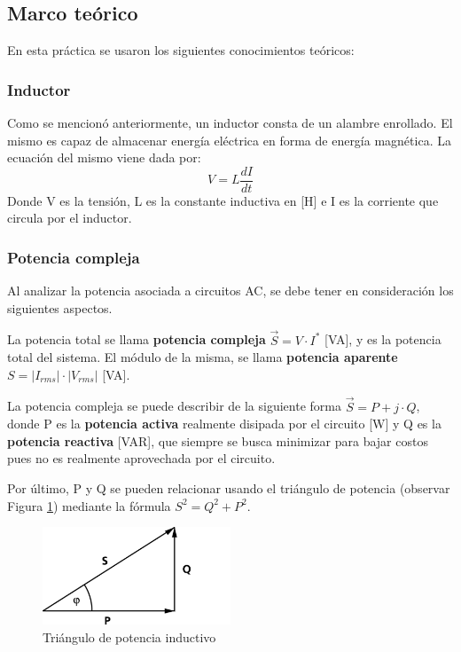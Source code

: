 \documentclass{article}
\begin{document}
        \subsection{Marco teórico}

        En esta práctica se usaron los siguientes conocimientos teóricos:

        \subsubsection{Inductor}

        Como se mencionó anteriormente, un inductor consta de un alambre enrollado. El mismo es capaz de almacenar energía eléctrica en forma de energía magnética.
         La ecuación del mismo viene dada por:
        \begin{equation*}
            V=L \frac{dI}{dt}
        \end{equation*}
        Donde V es la tensión, L es la constante inductiva en [H] e I es la corriente que circula por el inductor.

        \subsubsection{Potencia compleja}

        Al analizar la potencia asociada a circuitos AC, se debe tener en consideración los siguientes aspectos.\par
        La potencia total se llama { \bfseries potencia compleja} $\vec{S}= V \cdot I^{*}$ [VA], y es la potencia 
        total del sistema. El módulo de la misma, se llama {\bfseries potencia aparente} $S=|I_{rms}| \cdot |V_{rms}|$ 
        [VA]. \par
        La potencia compleja se puede describir de la siguiente forma $\vec{S}=P + j \cdot Q$, donde P es la { \bfseries 
        potencia activa} realmente disipada por el circuito [W] y Q es la {\bfseries potencia reactiva} [VAR], que siempre se busca minimizar para 
        bajar costos pues no es realmente aprovechada por el circuito. \par
        Por último, P y Q se pueden relacionar usando el triángulo de potencia (observar Figura \ref{fig:triangulo_de_potencia}) mediante la fórmula $S^2=Q^2+P^2$. 



        \begin{figure}[h!] %
            \centering
            \includegraphics[width=0.5\textwidth]{Trojkat-mocy.png} %
            \caption{Triángulo de potencia inductivo}
            \label{fig:triangulo_de_potencia} %
        \end{figure}
    
\end{document}
